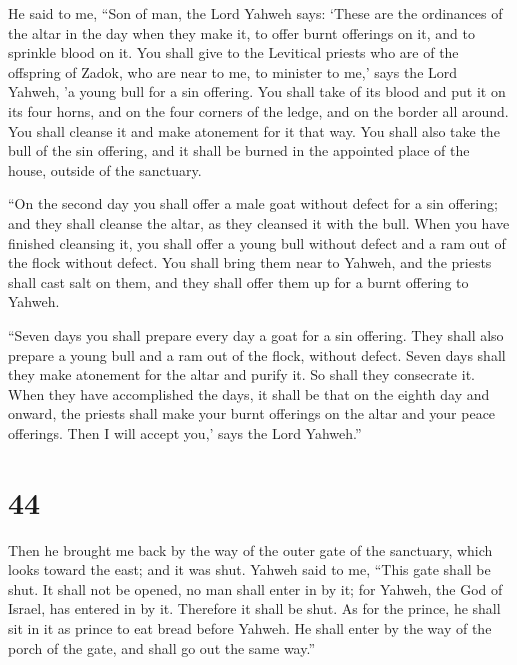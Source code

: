  He said to me, ``Son of man, the Lord Yahweh says:
`These are the ordinances of the altar in the day when they make it, to
offer burnt offerings on it, and to sprinkle blood on it.
 You shall give to the Levitical priests who are of the
offspring of Zadok, who are near to me, to minister to me,' says the
Lord Yahweh, 'a young bull for a sin offering.  You shall
take of its blood and put it on its four horns, and on the four corners
of the ledge, and on the border all around. You shall cleanse it and
make atonement for it that way.  You shall also take the
bull of the sin offering, and it shall be burned in the appointed place
of the house, outside of the sanctuary.

 ``On the second day you shall offer a male goat without
defect for a sin offering; and they shall cleanse the altar, as they
cleansed it with the bull.  When you have finished
cleansing it, you shall offer a young bull without defect and a ram out
of the flock without defect.  You shall bring them near
to Yahweh, and the priests shall cast salt on them, and they shall offer
them up for a burnt offering to Yahweh.

 ``Seven days you shall prepare every day a goat for a
sin offering. They shall also prepare a young bull and a ram out of the
flock, without defect.  Seven days shall they make
atonement for the altar and purify it. So shall they consecrate it.
 When they have accomplished the days, it shall be that
on the eighth day and onward, the priests shall make your burnt
offerings on the altar and your peace offerings. Then I will accept
you,' says the Lord Yahweh.''

\hypertarget{section-42}{%
\section{44}\label{section-42}}

 Then he brought me back by the way of the outer gate of
the sanctuary, which looks toward the east; and it was shut.
 Yahweh said to me, ``This gate shall be shut. It shall
not be opened, no man shall enter in by it; for Yahweh, the God of
Israel, has entered in by it. Therefore it shall be shut. 
As for the prince, he shall sit in it as prince to eat bread before
Yahweh. He shall enter by the way of the porch of the gate, and shall go
out the same way.''

